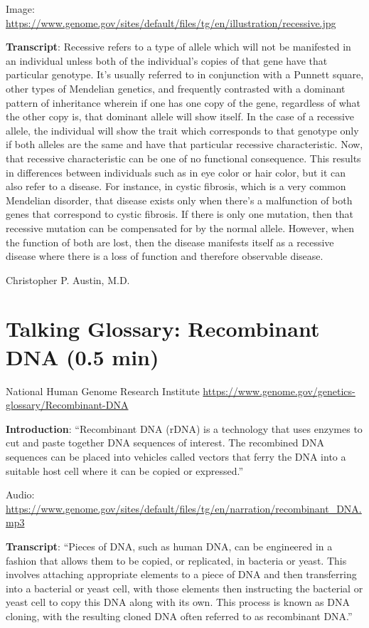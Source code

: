 \documentclass[
]{book}
\begin{document}
Image: \url{https://www.genome.gov/sites/default/files/tg/en/illustration/recessive.jpg}

\textbf{Transcript}: Recessive refers to a type of allele which will not be manifested in an individual unless both of the individual's copies of that gene have that particular genotype. It's usually referred to in conjunction with a Punnett square, other types of Mendelian genetics, and frequently contrasted with a dominant pattern of inheritance wherein if one has one copy of the gene, regardless of what the other copy is, that dominant allele will show itself. In the case of a recessive allele, the individual will show the trait which corresponds to that genotype only if both alleles are the same and have that particular recessive characteristic. Now, that recessive characteristic can be one of no functional consequence. This results in differences between individuals such as in eye color or hair color, but it can also refer to a disease. For instance, in cystic fibrosis, which is a very common Mendelian disorder, that disease exists only when there's a malfunction of both genes that correspond to cystic fibrosis. If there is only one mutation, then that recessive mutation can be compensated for by the normal allele. However, when the function of both are lost, then the disease manifests itself as a recessive disease where there is a loss of function and therefore observable disease.

Christopher P. Austin, M.D.

\hypertarget{talking-glossary-recombinant-dna-0.5-min}{%
\section{Talking Glossary: Recombinant DNA (0.5 min)}\label{talking-glossary-recombinant-dna-0.5-min}}

National Human Genome Research Institute
\url{https://www.genome.gov/genetics-glossary/Recombinant-DNA}

\textbf{Introduction}: ``Recombinant DNA (rDNA) is a technology that uses enzymes to cut and paste together DNA sequences of interest. The recombined DNA sequences can be placed into vehicles called vectors that ferry the DNA into a suitable host cell where it can be copied or expressed.''

Audio: \url{https://www.genome.gov/sites/default/files/tg/en/narration/recombinant_DNA.mp3}

\textbf{Transcript}: ``Pieces of DNA, such as human DNA, can be engineered in a fashion that allows them to be copied, or replicated, in bacteria or yeast. This involves attaching appropriate elements to a piece of DNA and then transferring into a bacterial or yeast cell, with those elements then instructing the bacterial or yeast cell to copy this DNA along with its own. This process is known as DNA cloning, with the resulting cloned DNA often referred to as recombinant DNA.''
\end{document}
